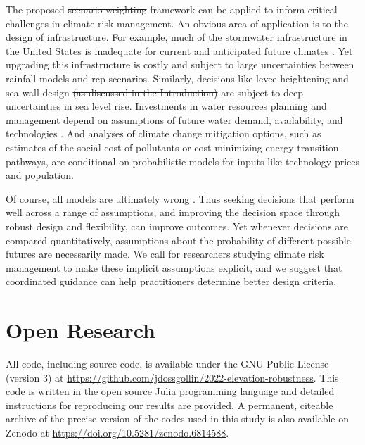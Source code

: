 \documentclass{agujournal2019}
\providecommand{\DIFadd}[1]{{\protect\color{blue}\uwave{#1}}} %
\providecommand{\DIFdel}[1]{{\protect\color{red}\sout{#1}}}                      %
\providecommand{\DIFaddbegin}{} %
\providecommand{\DIFaddend}{} %
\providecommand{\DIFdelbegin}{} %
\providecommand{\DIFdelend}{} %
\newcommand{\DIFscaledelfig}{0.5}
\newlength{\DIFdelgraphicswidth} %
\newlength{\DIFdelgraphicsheight} %
\newcommand{\DIFaddincludegraphics}[2][]{{\color{blue}\fbox{\DIFOincludegraphics[#1]{#2}}}} %
\newcommand{\DIFdelincludegraphics}[2][]{%
\sbox{\DIFdelgraphicsbox}{\DIFOincludegraphics[#1]{#2}}%
\settoboxwidth{\DIFdelgraphicswidth}{\DIFdelgraphicsbox} %
\settoboxtotalheight{\DIFdelgraphicsheight}{\DIFdelgraphicsbox} %
\scalebox{\DIFscaledelfig}{%
\parbox[b]{\DIFdelgraphicswidth}{\usebox{\DIFdelgraphicsbox}\\[-\baselineskip] \rule{\DIFdelgraphicswidth}{0em}}\llap{\resizebox{\DIFdelgraphicswidth}{\DIFdelgraphicsheight}{%
\setlength{\unitlength}{\DIFdelgraphicswidth}%
\begin{picture}(1,1)%
\thicklines\linethickness{2pt} %
{\color[rgb]{1,0,0}\put(0,0){\framebox(1,1){}}}%
{\color[rgb]{1,0,0}\put(0,0){\line( 1,1){1}}}%
{\color[rgb]{1,0,0}\put(0,1){\line(1,-1){1}}}%
\end{picture}%
}\hspace*{3pt}}} %
} %
\DeclareRobustCommand{\DIFaddbegin}{\DIFOaddbegin \let\includegraphics\DIFaddincludegraphics} %
\DeclareRobustCommand{\DIFaddend}{\DIFOaddend \let\includegraphics\DIFOincludegraphics} %
\DeclareRobustCommand{\DIFdelbegin}{\DIFOdelbegin \let\includegraphics\DIFdelincludegraphics} %
\DeclareRobustCommand{\DIFdelend}{\DIFOaddend \let\includegraphics\DIFOincludegraphics} %
\begin{document}
The proposed \DIFdelbegin \DIFdel{scenario weighting }\DIFdelend \DIFaddbegin \DIFadd{\mbox{%
    \gls{sow} }\hskip0pt%
  re-weighting }\DIFaddend framework can be applied to inform critical challenges in climate risk management.
An obvious area of application is to the design of infrastructure.
For example, much of the stormwater infrastructure in the United States is inadequate for current and anticipated future climates \cite{lopez-cantu:2018}.
Yet upgrading this infrastructure is costly and subject to large uncertainties between rainfall models \cite{sharma_rcp:2021} and \gls{rcp} scenarios.
Similarly, decisions like  levee heightening \cite{garner_slrise:2018,oddo_coastal:2017,vandantzig_dike:1956} and sea wall design \DIFdelbegin \DIFdel{(as discussed in the Introduction) }\DIFdelend \DIFaddbegin \DIFadd{\mbox{%
    \cite[Appendix D.,~p.~2-59]{USACE_coastal:2021} }\hskip0pt%
}\DIFaddend are subject to deep uncertainties \DIFdelbegin \DIFdel{in }\DIFdelend \DIFaddbegin \DIFadd{including }\DIFaddend sea level rise.
Investments in water resources planning and management \DIFaddbegin \DIFadd{also }\DIFaddend depend on assumptions of future water demand, availability, and technologies \cite{trindade_deeplyuncertainpathways:2019}.
And analyses of climate change mitigation options, such as estimates of the social cost of pollutants \cite{errickson_methane:2021} or cost-minimizing energy transition pathways, are conditional on probabilistic models for inputs like technology prices and population.

Of course, all models are ultimately wrong \cite{box_sciencestatistics:1976}.
Thus seeking decisions that perform well across a range of assumptions, and improving the decision space through robust design and flexibility, can improve outcomes.
Yet whenever decisions are compared quantitatively, assumptions about the probability of different possible futures are necessarily made.
We call for researchers studying climate risk management to make these implicit assumptions explicit, and we suggest that coordinated guidance can help practitioners determine better design criteria.

\section{Open Research}

All code, including source code, is available under the GNU Public License (version 3) at \url{https://github.com/jdossgollin/2022-elevation-robustness}.
This code is written in the open source Julia programming language and detailed instructions for reproducing our results are provided.
A permanent, citeable archive of the precise version of the codes used in this study is also available on Zenodo at \url{https://doi.org/10.5281/zenodo.6814588}.
\end{document}
